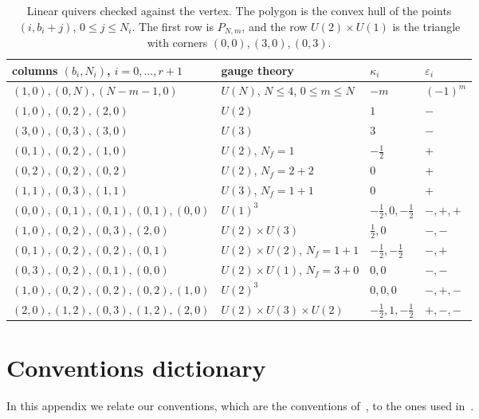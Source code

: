 \documentclass[11pt]{article}
\theoremstyle{plain}
\theoremstyle{definition}
\theoremstyle{remark}
\begin{document}
\begin{table}[ht]
\centering
\renewcommand{\arraystretch}{1.15}
\begin{tabular}{llll}
\toprule
columns $(b_i,N_i)$, $i=0,\ldots,r+1$ & gauge theory & $\kappa_i$ & $\varepsilon_i$\\
\midrule
$(1,0),(0,N),(N-m-1,0)$ & $U(N)$, $N\le4$, $0\le m\le N$ & $-m$ & $(-1)^m$\\
$(1,0),(0,2),(2,0)$ & $U(2)$ & $1$ & $-$\\
$(3,0),(0,3),(3,0)$ & $U(3)$ & $3$ & $-$\\
$(0,1),(0,2),(1,0)$ & $U(2)$, $N_f=1$ & $-\tfrac12$ & $+$\\
$(0,2),(0,2),(0,2)$ & $U(2)$, $N_f=2+2$ & $0$ & $+$\\
$(1,1),(0,3),(1,1)$ & $U(3)$, $N_f=1+1$ & $0$ & $+$\\
$(0,0),(0,1),(0,1),(0,1),(0,0)$ & $U(1)^3$ & $-\tfrac12,0,-\tfrac12$ & $-,+,+$\\
$(1,0),(0,2),(0,3),(2,0)$ & $U(2)\times U(3)$ & $\tfrac12,0$ & $-,-$\\
$(0,1),(0,2),(0,2),(0,1)$ & $U(2)\times U(2)$, $N_f=1+1$ & $-\tfrac12,-\tfrac12$ & $-,+$\\
$(0,3),(0,2),(0,1),(0,0)$ & $U(2)\times U(1)$, $N_f=3+0$ & $0,0$ & $-,-$\\
$(1,0),(0,2),(0,2),(0,2),(1,0)$ & $U(2)^3$ & $0,0,0$ & $-,+,-$\\
$(2,0),(1,2),(0,3),(1,2),(2,0)$ & $U(2)\times U(3)\times U(2)$ & $-\tfrac12,1,-\tfrac12$ & $+,-,-$\\
\bottomrule
\end{tabular}
\caption{Linear quivers checked against the vertex. The polygon is the convex hull of the points
$(i,b_i+j)$, $0\le j\le N_i$. The first row is $P_{N,m}$, and the row $U(2)\times U(1)$ is the triangle with corners $(0,0),(3,0),(0,3)$.}\label{tab:quiver}
\end{table}

\section{Conventions dictionary}\label{app:conventions}

In this appendix we relate our conventions, which are the conventions of~\cite{Kon}, to the ones
used in~\cite{AKMV,Marino,IKP-strip}.
\end{document}
